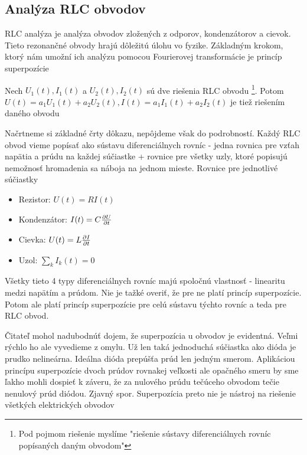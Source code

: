 \subsection{Analýza RLC obvodov}

RLC analýza je analýza obvodov zložených z odporov, kondenzátorov a
cievok. Tieto rezonančné obvody hrajú dôležitú úlohu vo fyzike.
Základným krokom, ktorý nám umožní ich analýzu pomocou Fourierovej
transformácie je princíp superpozície
\begin{veta}
 Nech $U_1(t), I_1(t)$ a $U_2(t), I_2(t)$ sú dve riešenia RLC obvodu
 \footnote{Pod pojmom riešenie myslíme "riešenie sústavy
 diferenciálnych rovníc popísaných daným obvodom"}.
 Potom $U(t)=a_1 U_1(t) + a_2 U_2(t), I(t)=a_1 I_1(t) + a_2 I_2(t)$ je
 tiež riešením daného obvodu
\end{veta}
\begin{dokaz}
    Načrtneme si základné črty dôkazu, nepôjdeme však do podrobností.
    Každý RLC obvod vieme popísať ako sústavu diferenciálnych rovníc - 
    jedna rovnica pre vzťah napätia a prúdu na každej súčiastke +
    rovnice pre všetky uzly, ktoré popisujú nemožnosť hromadenia sa
    náboja na jednom mieste.
    Rovnice pre jednotlivé súčiastky
    \begin{itemize}
        \item Rezistor: $U(t) = R I(t)$
        \item Kondenzátor: $I(t) = C \frac{\partial U}{\partial t}$
        \item Cievka: $U(t) = L \frac{\partial I}{\partial t}$
        \item Uzol: $\sum_{k} I_k(t) = 0$
    \end{itemize}
    Všetky tieto 4 typy diferenciálnych rovníc majú spoločnú vlastnosť
    - linearitu medzi napätím a prúdom. Nie je tažké overiť, že pre ne
      platí princíp superpozície. Potom ale platí princíp superpozície
      pre celú sústavu týchto rovníc a teda pre RLC obvod.
\end{dokaz}
\begin{poznamka}
    Čitateľ mohol nadubodnúť dojem, že superpozícia u obvodov je
    evidentná. Veľmi rýchlo ho ale vyvedieme z omylu. Už len taká
    jednoduchá súčiastka ako dióda je prudko nelineárna. Ideálna dióda
    prepúšťa prúd len jedným smerom. Aplikáciou princípu superpozície
    dvoch prúdov rovnakej veľkosti ale opačného smeru by sme ľakho
    mohli dospieť k záveru, že za nulového prúdu tečúceho obvodom
    tečie nenulový prúd diódou. Zjavný spor. Superpozícia preto nie je 
     nástroj na riešenie všetkých elektrických obvodov
\end{poznamka}


